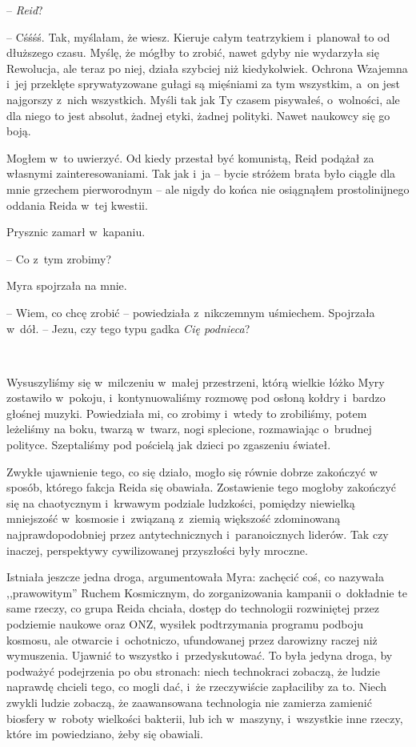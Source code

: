 \documentclass[oneside,polish,11pt,sfheadings]{mwbk}
\begin{document}
-- \emph{Reid}?

-- Cśśśś. Tak, myślałam, że wiesz. Kieruje całym teatrzykiem i~planował
to od dłuższego czasu. Myślę, że mógłby to zrobić, nawet gdyby nie
wydarzyła się Rewolucja, ale teraz po niej, działa szybciej niż
kiedykolwiek. Ochrona Wzajemna i~jej przeklęte sprywatyzowane gułagi są
mięśniami za tym wszystkim, a~on jest najgorszy z~nich wszystkich. Myśli
tak jak Ty czasem pisywałeś, o~wolności, ale dla niego to jest absolut,
żadnej etyki, żadnej polityki. Nawet naukowcy się go boją.

Mogłem w~to uwierzyć. Od kiedy przestał być komunistą, Reid podążał za
własnymi zainteresowaniami. Tak jak i~ja -- bycie stróżem brata było
ciągle dla mnie grzechem pierworodnym -- ale nigdy do końca nie
osiągnąłem prostolinijnego oddania Reida w~tej kwestii.

Prysznic zamarł w~kapaniu.

-- Co z~tym zrobimy?

Myra spojrzała na mnie. 

-- Wiem, co chcę zrobić -- powiedziała z~nikczemnym uśmiechem. Spojrzała w~dół. -- Jezu, czy tego typu gadka \emph{Cię podnieca}?

~

Wysuszyliśmy się w~milczeniu w~małej przestrzeni, którą wielkie łóżko
Myry zostawiło w~pokoju, i~kontynuowaliśmy rozmowę pod osłoną kołdry i~bardzo głośnej muzyki. Powiedziała mi, co zrobimy i~wtedy to zrobiliśmy,
potem leżeliśmy na boku, twarzą w~twarz, nogi splecione, rozmawiając o~brudnej polityce. Szeptaliśmy pod pościelą jak dzieci po zgaszeniu
świateł.

Zwykłe ujawnienie tego, co się działo, mogło się równie dobrze zakończyć
w sposób, którego fakcja Reida się obawiała. Zostawienie tego mogłoby
zakończyć się na chaotycznym i~krwawym podziale ludzkości, pomiędzy
niewielką mniejszość w~kosmosie i~związaną z~ziemią większość
zdominowaną najprawdopodobniej przez antytechnicznych i~paranoicznych
liderów. Tak czy inaczej, perspektywy cywilizowanej przyszłości były
mroczne.

Istniała jeszcze jedna droga, argumentowała Myra: zachęcić coś, co
nazywała ,,prawowitym'' Ruchem Kosmicznym, do zorganizowania kampanii o~dokładnie te same rzeczy, co grupa Reida chciała, dostęp do technologii
rozwiniętej przez podziemie naukowe oraz ONZ, wysiłek podtrzymania
programu podboju kosmosu, ale otwarcie i~ochotniczo, ufundowanej przez
darowizny raczej niż wymuszenia. Ujawnić to wszystko i~przedyskutować.
To była jedyna droga, by podważyć podejrzenia po obu stronach: niech
technokraci zobaczą, że ludzie naprawdę chcieli tego, co mogli dać, i~że
rzeczywiście zapłaciliby za to. Niech zwykli ludzie zobaczą, że
zaawansowana technologia nie zamierza zamienić biosfery w~roboty
wielkości bakterii, lub ich w~maszyny, i~wszystkie inne rzeczy, które im
powiedziano, żeby się obawiali.
\end{document}
